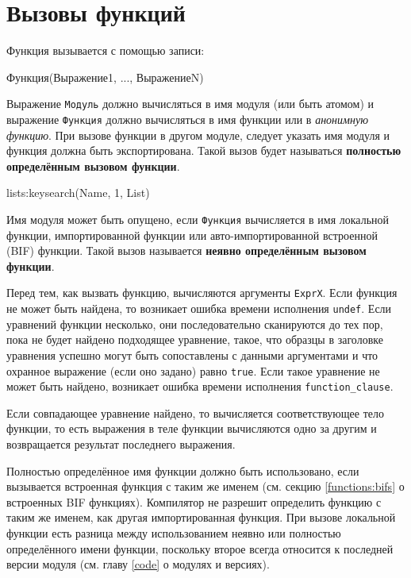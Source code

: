 \newpage


\section{Вызовы функций}

Функция вызывается с помощью записи:

\begin{erlangru}
[Модуль:]Функция(Выражение1, ..., ВыражениеN)
\end{erlangru}

Выражение \texttt{Модуль} должно вычисляться в имя модуля (или быть атомом) и
выражение \texttt{Функция} должно вычисляться в имя функции или в 
\emph{анонимную функцию}. При вызове функции в другом модуле, следует указать 
имя модуля и функция должна быть экспортирована. Такой вызов будет называться
\textbf{полностью определённым вызовом функции}.

\begin{erlang}
lists:keysearch(Name, 1, List)
\end{erlang}

Имя модуля может быть опущено, если \texttt{Функция} вычисляется в имя 
локальной функции, импортированной функции или авто-импортированной встроенной
(BIF)  функции. Такой вызов называется \textbf{неявно определённым вызовом
функции}.

Перед тем, как вызвать функцию, вычисляются аргументы \texttt{ExprX}.  Если 
функция не может быть найдена, то возникает ошибка времени исполнения
\texttt{undef}. Если уравнений функции несколько, они последовательно
сканируются до тех пор, пока не будет найдено подходящее уравнение, такое, что
образцы в заголовке уравнения успешно могут быть сопоставлены с данными
аргументами и что охранное выражение  (если оно задано) равно \texttt{true}.
Если такое уравнение не может быть найдено, возникает ошибка времени исполнения 
\texttt{function\_clause}.

Если совпадающее уравнение найдено, то вычисляется соответствующее тело 
\linebreak
функции, то есть выражения в теле функции вычисляются одно за другим и 
возвращается результат последнего выражения.

Полностью определённое имя функции должно быть использовано, если вызывается 
встроенная функция с таким же именем (см. секцию \ref{functions:bifs} о 
встроенных BIF функциях).  Компилятор не разрешит определить функцию с таким же
именем, как другая импортированная функция. При вызове локальной функции есть
разница между использованием неявно или полностью определённого имени функции,
поскольку второе всегда относится к последней версии модуля (см. главу
\ref{code} о модулях и версиях).


